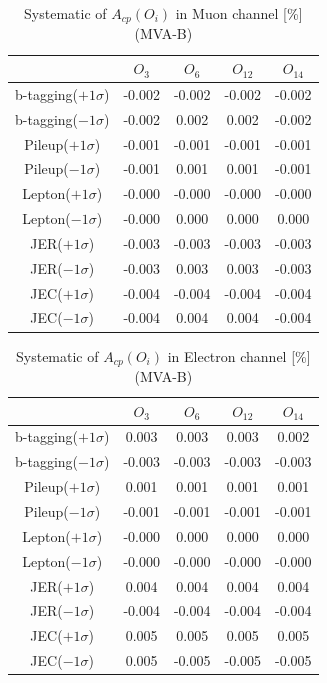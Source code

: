 		\begin{center}
		\setlength{\tabcolsep}{12pt}
		\begin{longtable}{ | c | c c c c | }
		\caption{Systematic of $A_{cp}(O_i)$ in Muon channel [\%] (MVA-B)}\\
		\hline
		 [\%] & $O_3$ & $O_6$ & $O_{12}$ & $O_{14}$ \\
		\hline
		b-tagging($+1\sigma$) & -0.002 & -0.002 & -0.002 & -0.002 \\
		b-tagging($-1\sigma$) & -0.002 & 0.002 & 0.002 & -0.002 \\
		\hline
		Pileup($+1\sigma$) & -0.001 & -0.001 & -0.001 & -0.001 \\
		Pileup($-1\sigma$) & -0.001 & 0.001 & 0.001 & -0.001 \\
		\hline
		Lepton($+1\sigma$) & -0.000 & -0.000 & -0.000 & -0.000 \\
		Lepton($-1\sigma$) & -0.000 & 0.000 & 0.000 & 0.000 \\
		\hline
		JER($+1\sigma$) & -0.003 & -0.003 & -0.003 & -0.003 \\
		JER($-1\sigma$) & -0.003 & 0.003 & 0.003 & -0.003 \\
		\hline
		JEC($+1\sigma$) & -0.004 & -0.004 & -0.004 & -0.004 \\
		JEC($-1\sigma$) & -0.004 & 0.004 & 0.004 & -0.004 \\
		\hline
		\end{longtable}
		\end{center}

		\begin{center}
		\setlength{\tabcolsep}{12pt}
		\begin{longtable}{ | c | c c c c | }
		\caption{Systematic of $A_{cp}(O_i)$ in Electron channel [\%] (MVA-B)}\\
		\hline
		 [\%] & $O_3$ & $O_6$ & $O_{12}$ & $O_{14}$ \\
		\hline
		b-tagging($+1\sigma$) & 0.003 & 0.003 & 0.003 & 0.002 \\
		b-tagging($-1\sigma$) & -0.003 & -0.003 & -0.003 & -0.003 \\
		\hline
		Pileup($+1\sigma$) & 0.001 & 0.001 & 0.001 & 0.001 \\
		Pileup($-1\sigma$) & -0.001 & -0.001 & -0.001 & -0.001 \\
		\hline
		Lepton($+1\sigma$) & -0.000 & 0.000 & 0.000 & 0.000 \\
		Lepton($-1\sigma$) & -0.000 & -0.000 & -0.000 & -0.000 \\
		\hline
		JER($+1\sigma$) & 0.004 & 0.004 & 0.004 & 0.004 \\
		JER($-1\sigma$) & -0.004 & -0.004 & -0.004 & -0.004 \\
		\hline
		JEC($+1\sigma$) & 0.005 & 0.005 & 0.005 & 0.005 \\
		JEC($-1\sigma$) & 0.005 & -0.005 & -0.005 & -0.005 \\
		\hline
		\end{longtable}
		\end{center}


\FloatBarrier
